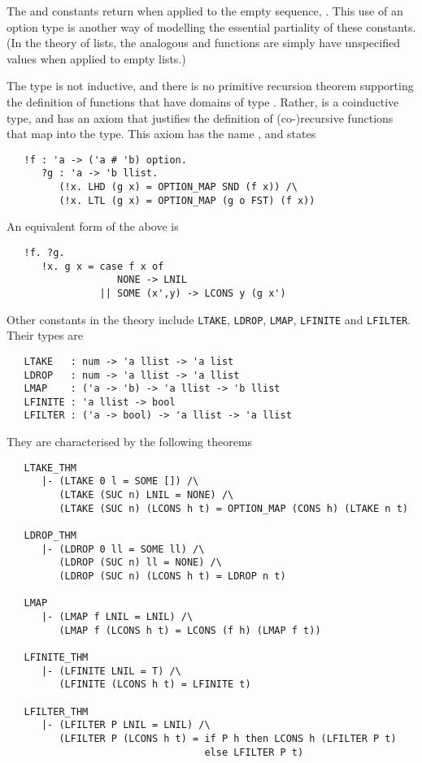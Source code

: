 The  and  constants return  when applied to
the empty sequence, .  This use of an option type is another
way of modelling the essential partiality of these constants.  (In the
theory of lists, the analogous  and  functions are
simply have unspecified values when applied to empty lists.)

The type  is not inductive, and there is no primitive
recursion theorem supporting the definition of functions that have
domains of type .  Rather,  is a coinductive type,
and has an axiom that justifies the definition of (co-)recursive
functions that map into the  type.  This axiom has the name
, and states
{\small
\begin{verbatim}
   !f : 'a -> ('a # 'b) option.
      ?g : 'a -> 'b llist.
         (!x. LHD (g x) = OPTION_MAP SND (f x)) /\
         (!x. LTL (g x) = OPTION_MAP (g o FST) (f x))
\end{verbatim}
}
\noindent An equivalent form of the above is
{\small
\begin{verbatim}
   !f. ?g.
      !x. g x = case f x of
                   NONE -> LNIL
                || SOME (x',y) -> LCONS y (g x')
\end{verbatim}
}

Other constants in the theory  include \texttt{LTAKE},
\texttt{LDROP}, \texttt{LMAP}, \texttt{LFINITE} and
\texttt{LFILTER}. Their types are
{\small
\begin{verbatim}
   LTAKE   : num -> 'a llist -> 'a list
   LDROP   : num -> 'a llist -> 'a llist
   LMAP    : ('a -> 'b) -> 'a llist -> 'b llist
   LFINITE : 'a llist -> bool
   LFILTER : ('a -> bool) -> 'a llist -> 'a llist
\end{verbatim}
}
\noindent They are characterised by the following theorems
{\small
\begin{verbatim}
   LTAKE_THM
      |- (LTAKE 0 l = SOME []) /\
         (LTAKE (SUC n) LNIL = NONE) /\
         (LTAKE (SUC n) (LCONS h t) = OPTION_MAP (CONS h) (LTAKE n t)

   LDROP_THM
      |- (LDROP 0 ll = SOME ll) /\
         (LDROP (SUC n) ll = NONE) /\
         (LDROP (SUC n) (LCONS h t) = LDROP n t)

   LMAP
      |- (LMAP f LNIL = LNIL) /\
         (LMAP f (LCONS h t) = LCONS (f h) (LMAP f t))

   LFINITE_THM
      |- (LFINITE LNIL = T) /\
         (LFINITE (LCONS h t) = LFINITE t)

   LFILTER_THM
      |- (LFILTER P LNIL = LNIL) /\
         (LFILTER P (LCONS h t) = if P h then LCONS h (LFILTER P t)
                                  else LFILTER P t)
\end{verbatim}
}

